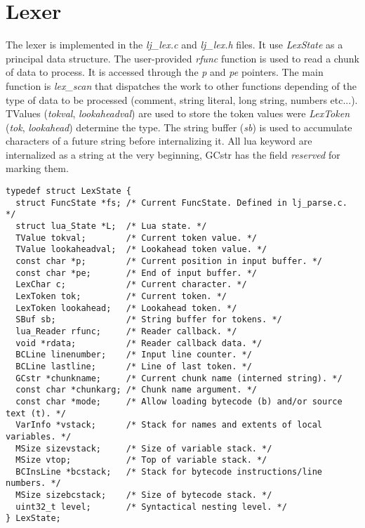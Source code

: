 

\section{Lexer}
\label{Sec:Lexer}

The lexer is implemented in the \emph{lj\_lex.c} and \emph{lj\_lex.h} files.
It use \emph{LexState} as a principal data structure. The user-provided
\emph{rfunc} function is used to read a chunk of data to process. It is accessed
through the \emph{p} and \emph{pe} pointers. The main function is
\emph{lex\_scan} that dispatches the work to other functions depending of the
type of data to be processed (comment, string literal, long string, numbers
etc...). TValues (\emph{tokval}, \emph{lookaheadval}) are used to store the
token values were \emph{LexToken} (\emph{tok}, \emph{lookahead}) determine the
type. The string buffer (\emph{sb}) is used to accumulate characters of a future
string before internalizing it. All lua keyword are internalized as a string at
the very beginning, GCstr has the field \emph{reserved} for marking them.

\begin{lstlisting}[style=CStyle]
typedef struct LexState {
  struct FuncState *fs; /* Current FuncState. Defined in lj_parse.c. */
  struct lua_State *L;  /* Lua state. */
  TValue tokval;        /* Current token value. */
  TValue lookaheadval;  /* Lookahead token value. */
  const char *p;        /* Current position in input buffer. */
  const char *pe;       /* End of input buffer. */
  LexChar c;            /* Current character. */
  LexToken tok;         /* Current token. */
  LexToken lookahead;   /* Lookahead token. */
  SBuf sb;              /* String buffer for tokens. */
  lua_Reader rfunc;     /* Reader callback. */
  void *rdata;          /* Reader callback data. */
  BCLine linenumber;    /* Input line counter. */
  BCLine lastline;      /* Line of last token. */
  GCstr *chunkname;     /* Current chunk name (interned string). */
  const char *chunkarg; /* Chunk name argument. */
  const char *mode;     /* Allow loading bytecode (b) and/or source text (t). */
  VarInfo *vstack;      /* Stack for names and extents of local variables. */
  MSize sizevstack;     /* Size of variable stack. */
  MSize vtop;           /* Top of variable stack. */
  BCInsLine *bcstack;   /* Stack for bytecode instructions/line numbers. */
  MSize sizebcstack;    /* Size of bytecode stack. */
  uint32_t level;       /* Syntactical nesting level. */
} LexState;
\end{lstlisting}

